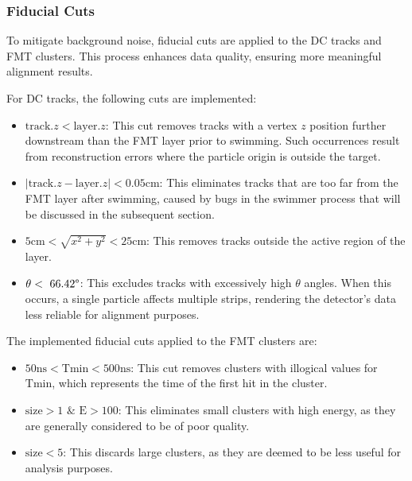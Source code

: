 \subsubsection{Fiducial Cuts}
\label{12.21::fiducial_cuts}
    To mitigate background noise, fiducial cuts are applied to the DC tracks and FMT clusters.
    This process enhances data quality, ensuring more meaningful alignment results.

    For DC tracks, the following cuts are implemented:
    \begin{itemize}
        \item
            $\text{track}.z < \text{layer}.z$:
            This cut removes tracks with a vertex $z$ position further downstream than the FMT layer prior to swimming.
            Such occurrences result from reconstruction errors where the particle origin is outside the target.
        \item
            $\mid\text{track}.z - \text{layer}.z\mid < 0.05 \text{cm}$:
            This eliminates tracks that are too far from the FMT layer after swimming, caused by bugs in the swimmer process that will be discussed in the subsequent section.
        \item
            $5 \text{cm} < \sqrt{x^2 + y^2} < 25 \text{cm}$:
            This removes tracks outside the active region of the layer.
        \item
            $\theta < ~66.42\degree$:
            This excludes tracks with excessively high $\theta$ angles.
            When this occurs, a single particle affects multiple strips, rendering the detector's data less reliable for alignment purposes.
    \end{itemize}

    The implemented fiducial cuts applied to the FMT clusters are:
    \begin{itemize}
        \item
            $50 \text{ns} < \text{T}{\text{min}} < 500 \text{ns}$:
            This cut removes clusters with illogical values for $\text{T}{\text{min}}$, which represents the time of the first hit in the cluster.
        \item
            $\text{size} > 1$ $\&$ $\text{E} > 100$:
            This eliminates small clusters with high energy, as they are generally considered to be of poor quality.
        \item
            $\text{size} < 5$:
            This discards large clusters, as they are deemed to be less useful for analysis purposes.
    \end{itemize}
